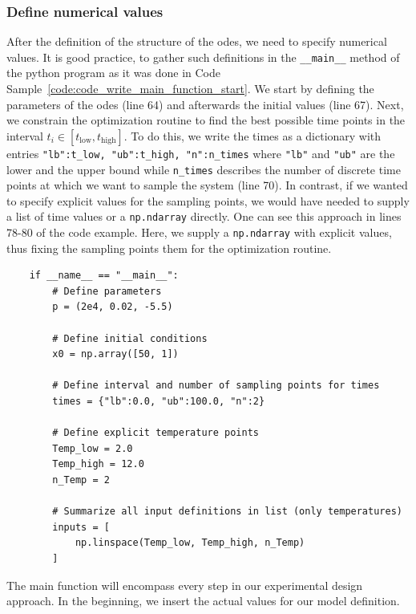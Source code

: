 \documentclass[graybox]{svmult}
\begin{document}
\subsubsection{Define numerical values}
After the definition of the structure of the \acp{ode}, we need to specify numerical values.
It is good practice, to gather such definitions in the \texttt{__main__} method of the python program as it was done in Code Sample~\ref{code:code_write_main_function_start}.
We start by defining the parameters of the \acp{ode} (line 64) and afterwards the initial values (line 67).
Next, we constrain the optimization routine to find the best possible time points in the interval $t_i\in\left[t_\text{low},t_\text{high}\right]$.
To do this, we write the times as a dictionary with entries \texttt{{"lb":t_low, "ub":t_high, "n":n_times}} where \texttt{"lb"} and \texttt{"ub"} are the lower and the upper bound while \texttt{n_times} describes the number of discrete time points at which we want to sample the system (line 70).
In contrast, if we wanted to specify explicit values for the sampling points, we would have needed to supply a list of time values or a \texttt{np.ndarray} directly.
One can see this approach in lines 78-80 of the code example.
Here, we supply a \texttt{np.ndarray} with explicit values, thus fixing the sampling points them for the optimization routine.
\begin{code}[h]
    \begin{verbatim}
    if __name__ == "__main__":
        # Define parameters
        p = (2e4, 0.02, -5.5)

        # Define initial conditions
        x0 = np.array([50, 1])

        # Define interval and number of sampling points for times
        times = {"lb":0.0, "ub":100.0, "n":2}

        # Define explicit temperature points
        Temp_low = 2.0
        Temp_high = 12.0
        n_Temp = 2

        # Summarize all input definitions in list (only temperatures)
        inputs = [
            np.linspace(Temp_low, Temp_high, n_Temp)
        ]
    \end{verbatim}
    \caption{
        The main function will encompass every step in our experimental design approach.
        In the beginning, we insert the actual values for our model definition.
    }
    \label{code:code_write_main_function_start}
\end{code}
\end{document}
